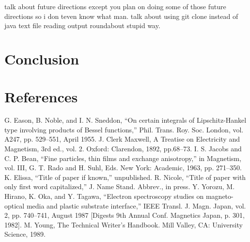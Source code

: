 \documentclass[conference]{IEEEtran}
\begin{document}
talk about future directions except you plan on doing some of those future directions so i don teven know what man. talk about using git clone instead of java text file reading output roundabout stupid way.

\section{Conclusion}


\section{References}



\begin{thebibliography}{00}
 G. Eason, B. Noble, and I. N. Sneddon, ``On certain integrals of Lipschitz-Hankel type involving products of Bessel functions,'' Phil. Trans. Roy. Soc. London, vol. A247, pp. 529--551, April 1955.
 J. Clerk Maxwell, A Treatise on Electricity and Magnetism, 3rd ed., vol. 2. Oxford: Clarendon, 1892, pp.68--73.
 I. S. Jacobs and C. P. Bean, ``Fine particles, thin films and exchange anisotropy,'' in Magnetism, vol. III, G. T. Rado and H. Suhl, Eds. New York: Academic, 1963, pp. 271--350.
 K. Elissa, ``Title of paper if known,'' unpublished.
 R. Nicole, ``Title of paper with only first word capitalized,'' J. Name Stand. Abbrev., in press.
 Y. Yorozu, M. Hirano, K. Oka, and Y. Tagawa, ``Electron spectroscopy studies on magneto-optical media and plastic substrate interface,'' IEEE Transl. J. Magn. Japan, vol. 2, pp. 740--741, August 1987 [Digests 9th Annual Conf. Magnetics Japan, p. 301, 1982].
 M. Young, The Technical Writer's Handbook. Mill Valley, CA: University Science, 1989.
\end{thebibliography}
\vspace{12pt}
\end{document}
